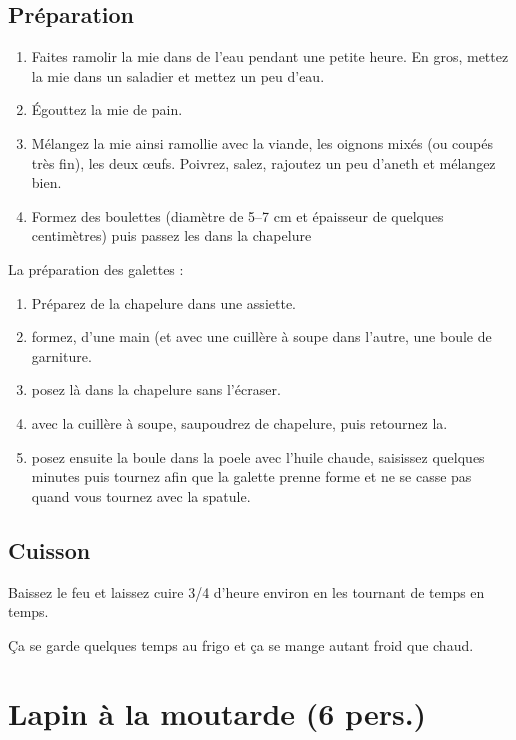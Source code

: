 \subsection*{Préparation}
\begin{enumerate}
\item Faites ramolir la mie dans de l'eau pendant une petite heure. En gros, mettez la mie dans un saladier et mettez un peu d'eau.
\item Égouttez la mie de pain.
\item Mélangez la mie ainsi ramollie avec la viande, les oignons mixés (ou coupés très fin), les deux œufs. Poivrez, salez, rajoutez un peu d'aneth et mélangez bien.
\item  Formez des boulettes (diamètre de 5--7 cm et épaisseur de quelques centimètres) puis passez les dans la chapelure
\end{enumerate}

La préparation des galettes :

\begin{enumerate}
\item Préparez de la chapelure dans une assiette.
\item formez, d'une main (et avec une cuillère à soupe dans l'autre, une boule de garniture.
\item posez là dans la chapelure sans l'écraser.
\item avec la cuillère à soupe, saupoudrez de chapelure, puis retournez la.
\item posez ensuite la boule dans la poele avec l'huile chaude, saisissez quelques minutes puis tournez afin que la galette prenne forme et ne se casse pas quand vous tournez avec la spatule.
\end{enumerate}


\subsection*{Cuisson}

Baissez le feu et laissez cuire 3/4 d'heure environ en les tournant de temps en temps.

\begin{remarque}
Ça se garde quelques temps au frigo et ça se mange autant froid que chaud.
\end{remarque}

\newpage
\section{Lapin à la moutarde (6 pers.)}
